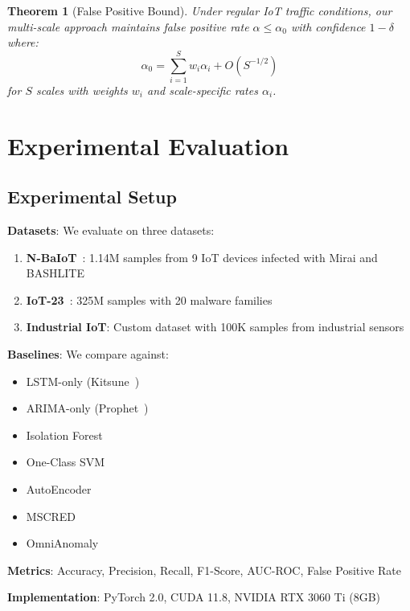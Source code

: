 \documentclass[10pt,conference]{IEEEtran}
\newtheorem{theorem}{Theorem}
\begin{document}
\begin{theorem}[False Positive Bound]
Under regular IoT traffic conditions, our multi-scale approach maintains false positive rate $\alpha \leq \alpha_0$ with confidence $1-\delta$ where:
\begin{equation}
\alpha_0 = \sum_{i=1}^{S} w_i \alpha_i + O(S^{-1/2})
\end{equation}
for $S$ scales with weights $w_i$ and scale-specific rates $\alpha_i$.
\end{theorem}

\section{Experimental Evaluation}

\subsection{Experimental Setup}

\textbf{Datasets}: We evaluate on three datasets:
\begin{enumerate}
    \item \textbf{N-BaIoT}~\cite{meidan2018nbaiot}: 1.14M samples from 9 IoT devices infected with Mirai and BASHLITE
    \item \textbf{IoT-23}~\cite{iot23}: 325M samples with 20 malware families
    \item \textbf{Industrial IoT}: Custom dataset with 100K samples from industrial sensors
\end{enumerate}

\textbf{Baselines}: We compare against:
\begin{itemize}
    \item LSTM-only (Kitsune~\cite{mirsky2018kitsune})
    \item ARIMA-only (Prophet~\cite{taylor2018forecasting})
    \item Isolation Forest~\cite{liu2008isolation}
    \item One-Class SVM~\cite{scholkopf2001estimating}
    \item AutoEncoder~\cite{sakurada2014anomaly}
    \item MSCRED~\cite{zhang2019deep}
    \item OmniAnomaly~\cite{su2019robust}
\end{itemize}

\textbf{Metrics}: Accuracy, Precision, Recall, F1-Score, AUC-ROC, False Positive Rate

\textbf{Implementation}: PyTorch 2.0, CUDA 11.8, NVIDIA RTX 3060 Ti (8GB)
\end{document}
